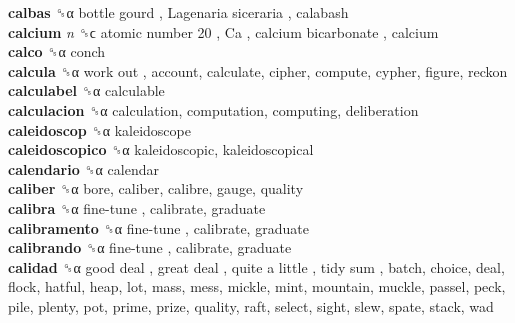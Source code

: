 \textbf{calbas} ␝α   bottle gourd ,  Lagenaria siceraria , calabash  \\
\textbf{calcium} \emph{n}  ␝ϲ   atomic number 20 ,  Ca ,  calcium bicarbonate , calcium  \\
\textbf{calco} ␝α  conch  \\
\textbf{calcula} ␝α   work out , account, calculate, cipher, compute, cypher, figure, reckon  \\
\textbf{calculabel} ␝α  calculable  \\
\textbf{calculacion} ␝α  calculation, computation, computing, deliberation  \\
\textbf{caleidoscop} ␝α  kaleidoscope  \\
\textbf{caleidoscopico} ␝α  kaleidoscopic, kaleidoscopical  \\
\textbf{calendario} ␝α  calendar  \\
\textbf{caliber} ␝α  bore, caliber, calibre, gauge, quality  \\
\textbf{calibra} ␝α   fine-tune , calibrate, graduate  \\
\textbf{calibramento} ␝α   fine-tune , calibrate, graduate  \\
\textbf{calibrando} ␝α   fine-tune , calibrate, graduate  \\
\textbf{calidad} ␝α   good deal ,  great deal ,  quite a little ,  tidy sum , batch, choice, deal, flock, hatful, heap, lot, mass, mess, mickle, mint, mountain, muckle, passel, peck, pile, plenty, pot, prime, prize, quality, raft, select, sight, slew, spate, stack, wad  \\
